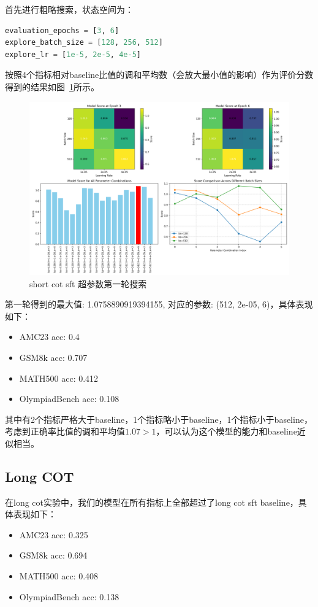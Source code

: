 \documentclass[12pt,hyperref,a4paper,UTF8]{ctexart}
\begin{document}
	首先进行粗略搜索，状态空间为：
	\begin{lstlisting}[language=python]
evaluation_epochs = [3, 6]
explore_batch_size = [128, 256, 512]
explore_lr = [1e-5, 2e-5, 4e-5]
	\end{lstlisting}
	按照4个指标相对baseline比值的调和平均数（会放大最小值的影响）作为评价分数得到的结果如图~\ref{fig:pic1}所示。
	\begin{figure}[htbp]
		\centering
		\includegraphics[width=\textwidth]{pic1.png}
		\caption{short cot sft 超参数第一轮搜索}
		\label{fig:pic1}
	\end{figure}
	第一轮得到的最大值: 1.0758890919394155, 对应的参数: (512, 2e-05, 6)，具体表现如下：
	\begin{itemize}
		\item AMC23 acc: 0.4
		\item GSM8k acc: 0.707
		\item MATH500 acc: 0.412
		\item OlympiadBench acc: 0.108
	\end{itemize}
	其中有2个指标严格大于baseline，1个指标略小于baseline，1个指标小于baseline，考虑到正确率比值的调和平均值$1.07>1$，可以认为这个模型的能力和baseline近似相当。
	
	\subsection{Long COT}
	在long cot实验中，我们的模型在所有指标上全部超过了long cot sft baseline，具体表现如下：
	\begin{itemize}
		\item AMC23 acc: 0.325
		\item GSM8k acc: 0.694
		\item MATH500 acc: 0.408
		\item OlympiadBench acc: 0.138
	\end{itemize}
	
\end{document}
